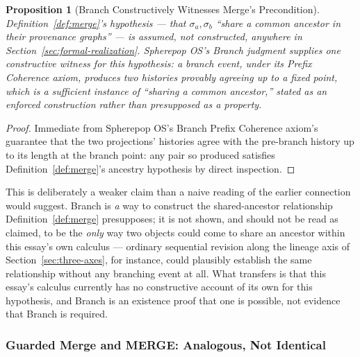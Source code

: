 \documentclass[11pt]{article}
\newtheorem{proposition}[theorem]{Proposition}
\theoremstyle{definition}
\begin{document}
\begin{proposition}[Branch Constructively Witnesses Merge's Precondition]
\label{prop:merge-presupposes-branch}
Definition~\ref{def:merge}'s hypothesis --- that $\sigma_a, \sigma_b$ ``share a common ancestor in their provenance graphs'' --- is assumed, not constructed, anywhere in Section~\ref{sec:formal-realization}. Spherepop OS's Branch judgment supplies one constructive witness for this hypothesis: a branch event, under its Prefix Coherence axiom, produces two histories provably agreeing up to a fixed point, which is a sufficient instance of ``sharing a common ancestor,'' stated as an enforced construction rather than presupposed as a property.
\end{proposition}
\begin{proof}
Immediate from Spherepop OS's Branch Prefix Coherence axiom's guarantee that the two projections' histories agree with the pre-branch history up to its length at the branch point: any pair so produced satisfies Definition~\ref{def:merge}'s ancestry hypothesis by direct inspection.
\end{proof}

This is deliberately a weaker claim than a naive reading of the earlier connection would suggest. Branch is \emph{a} way to construct the shared-ancestor relationship Definition~\ref{def:merge} presupposes; it is not shown, and should not be read as claimed, to be the \emph{only} way two objects could come to share an ancestor within this essay's own calculus --- ordinary sequential revision along the lineage axis of Section~\ref{sec:three-axes}, for instance, could plausibly establish the same relationship without any branching event at all. What transfers is that this essay's calculus currently has no constructive account of its own for this hypothesis, and Branch is an existence proof that one is possible, not evidence that Branch is required.

\subsubsection{Guarded Merge and MERGE: Analogous, Not Identical}
\end{document}
